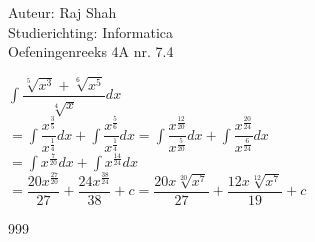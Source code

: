 \documentclass[a4paper]{article}
\begin{document}
  
\noindent \large Auteur: Raj Shah \\
\noindent \large Studierichting: Informatica\\
\noindent \large Oefeningenreeks 4A nr. 7.4 \\

\medskip

\normalsize

$\displaystyle\int \dfrac{\sqrt[5]{x^3} + \sqrt[6]{x^5}}{\sqrt[4]x} dx$\\

$ = \displaystyle\int \dfrac{x^{\tfrac{3}{5}}}{x^{\tfrac{1}{4}}}dx + \displaystyle\int \dfrac{x^{\tfrac{5}{6}}}{x^{\tfrac{1}{4}}}dx = \displaystyle\int \dfrac{x^{\tfrac{12}{20}}}{x^{\tfrac{5}{20}}}dx + \displaystyle\int \dfrac{x^{\tfrac{20}{24}}}{x^{\tfrac{6}{24}}}dx $\\

$ = \displaystyle\int x^{\tfrac{7}{20}}dx + \displaystyle\int x^{\tfrac{14}{24}}dx$\\

$ = \dfrac{20x^{\tfrac{27}{20}}}{27} + \dfrac{24x^{\tfrac{38}{24}}}{38} + c = \dfrac{20x \sqrt[20]{x^7}}{27} + \dfrac{12x\sqrt[12]{x^7}}{19} + c$


\begin{thebibliography}{999}
\end{thebibliography}
\end{document}
